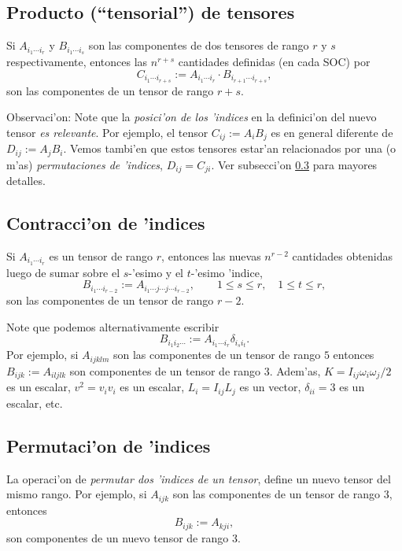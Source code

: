 \subsection{Producto (``tensorial'') de tensores}

Si $A_{i_1\cdots i_r}$ y $B_{i_1\cdots i_s}$ son las componentes de dos tensores de rango $r$ y $s$ respectivamente, entonces las $n^{r+s}$ cantidades definidas (en cada SOC) por
\begin{equation}
C_{i_1\cdots i_{r+s}}:=A_{i_1\cdots i_r}\cdot B_{i_{r+1}\cdots i_{r+s}},
\end{equation}
son las componentes de un tensor de rango $r+s$.

Observaci'on: Note que la \textit{posici'on de los 'indices} en la definici'on del nuevo tensor \textit{es relevante}. Por ejemplo, el tensor $C_{ij}:=A_iB_j$ es en general diferente de $D_{ij}:=A_jB_i$. Vemos tambi'en que estos tensores estar'an relacionados por una (o m'as) \textit{permutaciones de 'indices}, $D_{ij}=C_{ji}$. Ver subsecci'on \ref{sec:permu} para mayores detalles.

\subsection{Contracci'on de 'indices}
Si $A_{i_1\cdots i_r}$ es un tensor de rango $r$, entonces las nuevas $n^{r-2}$ cantidades obtenidas luego de sumar sobre el $s$-'esimo y el $t$-'esimo 'indice,
\begin{equation}
B_{i_1\cdots i_{r-2}}:=A_{i_1\cdots j\cdots j\cdots i_{r-2}}, \qquad 1\le s\le r, \quad 1\le t\le r,
\end{equation}
son las componentes de un tensor de rango $r-2$.

Note que podemos alternativamente escribir
\begin{equation}
B_{i_1i_2\cdots}:=A_{i_1\cdots i_r}\delta_{i_{s}i_{t}}.
\end{equation}
Por ejemplo, si $A_{ijklm}$ son las componentes de un tensor de rango $5$ entonces $B_{ijk}:=A_{iljlk}$ son componentes de un tensor de rango $3$. Adem'as, $K=I_{ij}\omega_i\omega_j/2$ es un escalar, $v^2=v_iv_i$ es un escalar, $L_i=I_{ij}L_j$ es un vector, $\delta_{ii}=3$ es un escalar, etc.

\subsection{Permutaci'on de 'indices}\label{sec:permu}
La operaci'on de \textit{permutar dos 'indices de un tensor}, define un nuevo tensor del mismo rango. Por ejemplo, si $A_{ijk}$ son las componentes de un tensor de rango $3$, entonces
\begin{equation}
B_{ijk}:=A_{kji},
\end{equation}
son componentes de un nuevo tensor de rango 3.


